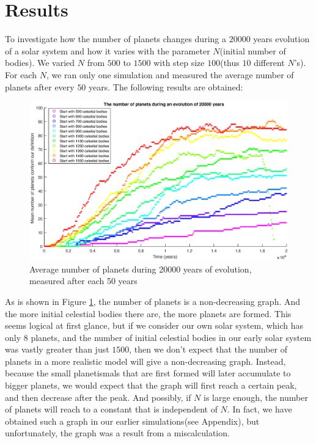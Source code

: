 \section{Results}\label{sec:results}
To investigate how the number of planets changes during a $20000$ years evolution of a solar system and how it varies with the parameter $N$(initial number of bodies). 
We varied $N$ from $500$ to $1500$ with step size $100$(thus $10$ different $N$'s). 
For each $N$, we ran only one simulation and measured the average number of planets after every $50$ years. The following results are obtained:

\begin{figure}[H]
\centering
\hspace*{-3cm}
\includegraphics[scale=0.8]{AantPlanetenNieuw.eps}
\caption{Average number of planets during 20000 years of evolution, measured after each 50 years}
    \label{fig:AantPlanetenNieuw}
\end{figure}
As is shown in Figure \ref{fig:AantPlanetenNieuw}, the number of planets is a non-decreasing graph. And the more initial celestial bodies there are, the more planets are formed. This seems logical at first glance, but if we consider our own solar system, which has only 8 planets, and the number of initial celestial bodies in our early solar system was vastly greater than just $1500$, then we don't expect that the number of planets in a more realistic model will give a non-decreasing graph. Instead, because the small planetismals that are first formed will later accumulate to bigger planets, we would expect that the graph will first reach a certain peak, and then decrease after the peak. And possibly, if $N$ is large enough, the number of planets will reach to a constant that is independent of $N$. In fact, we have obtained such a graph in our earlier simulations(see Appendix), but unfortunately, the graph was a result from a miscalculation. \\

